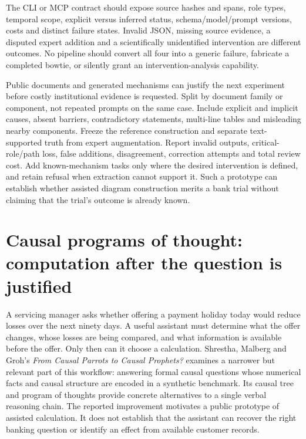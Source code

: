 The CLI or MCP contract should expose source hashes and spans, role types, temporal scope, explicit versus inferred status, schema/model/prompt versions, costs and distinct failure states. Invalid JSON, missing source evidence, a disputed expert addition and a scientifically unidentified intervention are different outcomes. No pipeline should convert all four into a generic failure, fabricate a completed bowtie, or silently grant an intervention-analysis capability.

Public documents and generated mechanisms can justify the next experiment before costly institutional evidence is requested. Split by document family or component, not repeated prompts on the same case. Include explicit and implicit causes, absent barriers, contradictory statements, multi-line tables and misleading nearby components. Freeze the reference construction and separate text-supported truth from expert augmentation. Report invalid outputs, critical-role/path loss, false additions, disagreement, correction attempts and total review cost. Add known-mechanism tasks only where the desired intervention is defined, and retain refusal when extraction cannot support it. Such a prototype can establish whether assisted diagram construction merits a bank trial without claiming that the trial's outcome is already known.~\citep{exec21_ace,exec21_ace_reference}


\section{Causal programs of thought: computation after the question is justified}
\label{exec21:prophets-scope}
A servicing manager asks whether offering a payment holiday today would reduce
losses over the next ninety days. A useful assistant must determine what the offer
changes, whose losses are being compared, and what information is available before
the offer. Only then can it choose a calculation. Shrestha, Malberg and Groh's
\emph{From Causal Parrots to Causal Prophets?} examines a narrower but relevant
part of this workflow: answering formal causal questions whose numerical facts
and causal structure are encoded in a synthetic benchmark. Its causal tree and
program of thoughts provide concrete alternatives to a single verbal reasoning
chain. The reported improvement motivates a public prototype of assisted
calculation. It does not establish that the assistant can recover the right
banking question or identify an effect from available customer records.
\citep{exec21_prophets}


